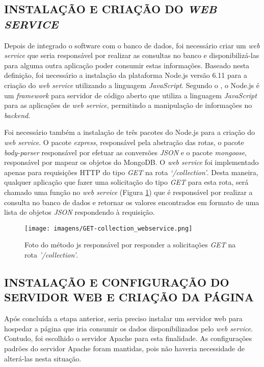 \subsection{INSTALAÇÃO E CRIAÇÃO DO \textit{WEB SERVICE}}
Depois de integrado o software com o banco de dados, foi necessário criar um \textit{web service} que seria responsável por realizar as consultas no banco e disponibilizá-las para alguma outra aplicação poder consumir estas informações. Baseado nesta definição, foi necessário a instalação da plataforma Node.js versão 6.11 para a criação do \textit{web service} utilizando a linguagem \textit{JavaScript}. Segundo o , o Node.js é um \textit{framework} para servidor de código aberto que utiliza a linguagem \textit{JavaScript} para as aplicações de \textit{web service}, permitindo a manipulação de informações no \textit{backend}.

Foi necessário também a instalação de três pacotes do Node.js para a criação do \textit{web service}. O pacote \textit{express}, responsável pela abstração das rotas, o pacote \textit{body-parser} responsável por efetuar as conversões \textit{JSON} e o pacote \textit{mongoose}, responsável por mapear os objetos do MongoDB. O \textit{web service} foi implementado apenas para requisições HTTP do tipo \textit{GET} na rota \textit{‘/collection’}. Desta maneira, qualquer aplicação que fazer uma solicitação do tipo \textit{GET} para esta rota, será chamado uma função no \textit{web service} (Figura \ref{Fig:get_collection}) que é responsável por realizar a consulta no banco de dados e retornar os valores encontrados em formato de uma lista de objetos \textit{JSON} respondendo à requisição.

\begin{figure}[!ht]
\centering
\caption{Foto do método js responsável por responder a solicitações \textit{GET} na rota \textit{'/collection'}.} 
{\texttt{[image: imagens/GET-collection\_webservice.png]}}\\
 \label{Fig:get_collection}
\end{figure}

\subsection{INSTALAÇÃO E CONFIGURAÇÃO DO SERVIDOR WEB E CRIAÇÃO DA PÁGINA}
Após concluída a etapa anterior, seria preciso instalar um servidor web para hospedar a página que iria consumir os dados disponibilizados pelo \textit{web service}. Contudo, foi escolhido o servidor Apache para esta finalidade. As configurações padrões do servidor Apache foram mantidas, pois não haveria necessidade de alterá-las nesta situação.

